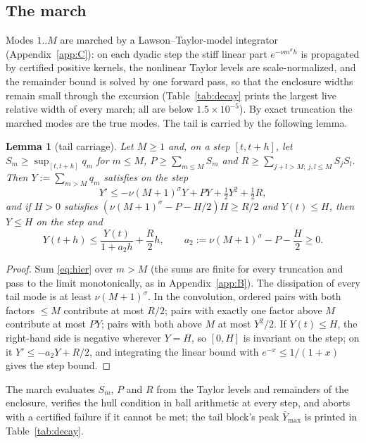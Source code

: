 \documentclass[11pt,a4paper]{article}
\theoremstyle{plain}
\newtheorem{lemma}[theorem]{Lemma}
\theoremstyle{definition}
\begin{document}
\subsection{The march}
Modes $1..M$ are marched by a Lawson--Taylor-model integrator (Appendix~\ref{app:C}): on each dyadic step the stiff linear part $e^{-\nu m^\sigma h}$ is propagated by certified positive kernels, the nonlinear Taylor levels are scale-normalized, and the remainder bound is solved by one forward pass, so that the enclosure widths remain small through the excursion (Table~\ref{tab:decay} prints the largest live relative width of every march; all are below $1.5\times10^{-5}$). By exact truncation the marched modes are the true modes. The tail is carried by the following lemma.

\begin{lemma}[tail carriage]\label{lem:tail}
Let $M\ge1$ and, on a step $[t,t+h]$, let $S_m\ge\sup_{[t,t+h]}q_m$ for $m\le M$, $P\ge\sum_{m\le M}S_m$ and $R\ge\sum_{j+l>M;\ j,l\le M}S_jS_l$. Then $Y:=\sum_{m>M}q_m$ satisfies on the step
\[
Y'\le-\nu(M+1)^\sigma Y+PY+\tfrac12Y^2+\tfrac12R,
\]
and if $H>0$ satisfies $(\nu(M+1)^\sigma-P-H/2)H\ge R/2$ and $Y(t)\le H$, then $Y\le H$ on the step and
\[
Y(t+h)\le\frac{Y(t)}{1+a_2h}+\frac{R}{2}h,\qquad a_2:=\nu(M+1)^\sigma-P-\frac H2\ge0.
\]
\end{lemma}
\begin{proof}
Sum \eqref{eq:hier} over $m>M$ (the sums are finite for every truncation and pass to the limit monotonically, as in Appendix~\ref{app:B}). The dissipation of every tail mode is at least $\nu(M+1)^\sigma$. In the convolution, ordered pairs with both factors $\le M$ contribute at most $R/2$; pairs with exactly one factor above $M$ contribute at most $PY$; pairs with both above $M$ at most $Y^2/2$. If $Y(t)\le H$, the right-hand side is negative wherever $Y=H$, so $[0,H]$ is invariant on the step; on it $Y'\le-a_2Y+R/2$, and integrating the linear bound with $e^{-x}\le1/(1+x)$ gives the step bound.
\end{proof}
The march evaluates $S_m$, $P$ and $R$ from the Taylor levels and remainders of the enclosure, verifies the hull condition in ball arithmetic at every step, and aborts with a certified failure if it cannot be met; the tail block's peak $\bar Y_{\max}$ is printed in Table~\ref{tab:decay}.
\end{document}
